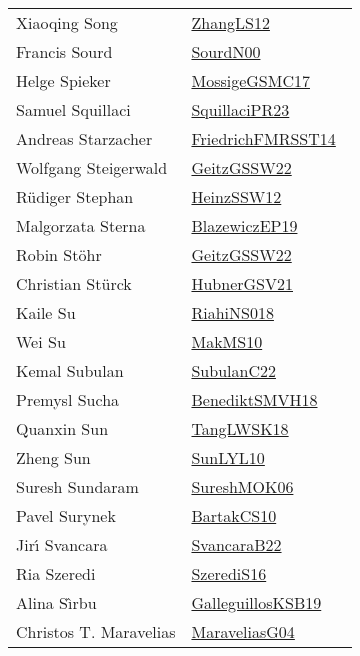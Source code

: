 {\begin{longtable}{p{4cm}p{20cm}}
Xiaoqing Song & \href{works/ZhangLS12.pdf}{ZhangLS12}~\cite{ZhangLS12}\\
Francis Sourd & \href{works/SourdN00.pdf}{SourdN00}~\cite{SourdN00}\\
Helge Spieker & \href{works/MossigeGSMC17.pdf}{MossigeGSMC17}~\cite{MossigeGSMC17}\\
Samuel Squillaci & \href{works/SquillaciPR23.pdf}{SquillaciPR23}~\cite{SquillaciPR23}\\
Andreas Starzacher & \href{}{FriedrichFMRSST14}~\cite{FriedrichFMRSST14}\\
Wolfgang Steigerwald & \href{works/GeitzGSSW22.pdf}{GeitzGSSW22}~\cite{GeitzGSSW22}\\
R{\"{u}}diger Stephan & \href{works/HeinzSSW12.pdf}{HeinzSSW12}~\cite{HeinzSSW12}\\
Malgorzata Sterna & \href{}{BlazewiczEP19}~\cite{BlazewiczEP19}\\
Robin St{\"{o}}hr & \href{works/GeitzGSSW22.pdf}{GeitzGSSW22}~\cite{GeitzGSSW22}\\
Christian St{\"{u}}rck & \href{works/HubnerGSV21.pdf}{HubnerGSV21}~\cite{HubnerGSV21}\\
Kaile Su & \href{works/RiahiNS018.pdf}{RiahiNS018}~\cite{RiahiNS018}\\
Wei Su & \href{works/MakMS10.pdf}{MakMS10}~\cite{MakMS10}\\
Kemal Subulan & \href{works/SubulanC22.pdf}{SubulanC22}~\cite{SubulanC22}\\
Premysl Sucha & \href{works/BenediktSMVH18.pdf}{BenediktSMVH18}~\cite{BenediktSMVH18}\\
Quanxin Sun & \href{works/TangLWSK18.pdf}{TangLWSK18}~\cite{TangLWSK18}\\
Zheng Sun & \href{works/SunLYL10.pdf}{SunLYL10}~\cite{SunLYL10}\\
Suresh Sundaram & \href{works/SureshMOK06.pdf}{SureshMOK06}~\cite{SureshMOK06}\\
Pavel Surynek & \href{works/BartakCS10.pdf}{BartakCS10}~\cite{BartakCS10}\\
Jir{\'{\i}} Svancara & \href{works/SvancaraB22.pdf}{SvancaraB22}~\cite{SvancaraB22}\\
Ria Szeredi & \href{works/SzerediS16.pdf}{SzerediS16}~\cite{SzerediS16}\\
Alina S{\^{\i}}rbu & \href{works/GalleguillosKSB19.pdf}{GalleguillosKSB19}~\cite{GalleguillosKSB19}\\
Christos T. Maravelias & \href{works/MaraveliasG04.pdf}{MaraveliasG04}~\cite{MaraveliasG04}\\

\end{longtable}}
